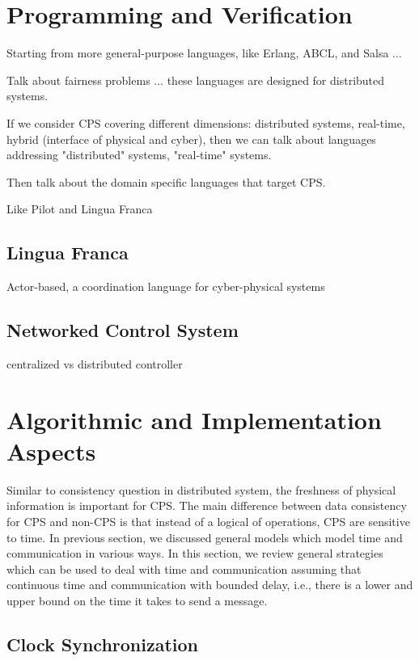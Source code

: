 \documentclass[
graybox,
envcountchap
]{svmult}
\begin{document}
\begin{bibunit}
\section{Programming and Verification}\label{sec:Programming}

Starting from more general-purpose languages, like Erlang, ABCL, and Salsa ...

Talk about fairness problems ... these languages are designed for distributed systems.

If we consider CPS covering different dimensions: distributed systems, real-time, hybrid (interface of physical and cyber), then we can talk about languages addressing "distributed" systems,  "real-time" systems.

Then talk about the domain specific languages that target CPS.

Like Pilot and Lingua Franca

\subsection{Lingua Franca}
Actor-based, a coordination language for cyber-physical systems


    \subsection{Networked Control System}

    centralized vs distributed controller

\section{Algorithmic and Implementation Aspects}

    Similar to consistency question in distributed system, the freshness of physical information is important for CPS.
    The main difference between data consistency for CPS and non-CPS is that instead of a logical of operations, CPS are sensitive to time.
    In previous section, we discussed general models which model time and communication in various ways.
    In this section, we review general strategies which can be used to deal with time and communication assuming that continuous time and communication with bounded delay, i.e., there is a lower and upper bound on the time it takes to send a message.

    \subsection{Clock Synchronization}
    

\end{bibunit}
\end{document}
